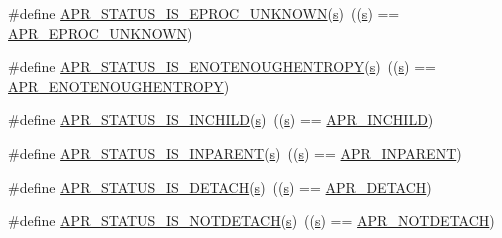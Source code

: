 \begin{DoxyCompactItemize}
\item 
\#define \hyperlink{group__APR__STATUS__IS_gab1267636d1f3fe0dcb79a22b735a5010}{A\+P\+R\+\_\+\+S\+T\+A\+T\+U\+S\+\_\+\+I\+S\+\_\+\+E\+P\+R\+O\+C\+\_\+\+U\+N\+K\+N\+O\+WN}(\hyperlink{pcretest_8txt_a062597889ba244b72877454b1d3adecf}{s})~((\hyperlink{pcretest_8txt_a062597889ba244b72877454b1d3adecf}{s}) == \hyperlink{group__APR__Error_ga01b21dc62b410707f44641d3cea3e6ed}{A\+P\+R\+\_\+\+E\+P\+R\+O\+C\+\_\+\+U\+N\+K\+N\+O\+WN})
\item 
\#define \hyperlink{group__APR__STATUS__IS_gab8b0af2df80bfb9edfc8dbcbb6bdf925}{A\+P\+R\+\_\+\+S\+T\+A\+T\+U\+S\+\_\+\+I\+S\+\_\+\+E\+N\+O\+T\+E\+N\+O\+U\+G\+H\+E\+N\+T\+R\+O\+PY}(\hyperlink{pcretest_8txt_a062597889ba244b72877454b1d3adecf}{s})~((\hyperlink{pcretest_8txt_a062597889ba244b72877454b1d3adecf}{s}) == \hyperlink{group__APR__Error_gaaee9e4e763844197e3750bb66ff75cd0}{A\+P\+R\+\_\+\+E\+N\+O\+T\+E\+N\+O\+U\+G\+H\+E\+N\+T\+R\+O\+PY})
\item 
\#define \hyperlink{group__APR__STATUS__IS_gad60d170a73ed74ec209a1b2165cacb61}{A\+P\+R\+\_\+\+S\+T\+A\+T\+U\+S\+\_\+\+I\+S\+\_\+\+I\+N\+C\+H\+I\+LD}(\hyperlink{pcretest_8txt_a062597889ba244b72877454b1d3adecf}{s})~((\hyperlink{pcretest_8txt_a062597889ba244b72877454b1d3adecf}{s}) == \hyperlink{group__APR__Error_ga5a2bb63099778699feeae9627474c179}{A\+P\+R\+\_\+\+I\+N\+C\+H\+I\+LD})
\item 
\#define \hyperlink{group__APR__STATUS__IS_ga4471f8de6eda3a673aa1f306114c012e}{A\+P\+R\+\_\+\+S\+T\+A\+T\+U\+S\+\_\+\+I\+S\+\_\+\+I\+N\+P\+A\+R\+E\+NT}(\hyperlink{pcretest_8txt_a062597889ba244b72877454b1d3adecf}{s})~((\hyperlink{pcretest_8txt_a062597889ba244b72877454b1d3adecf}{s}) == \hyperlink{group__APR__Error_ga79abc0fb43e51e0db87f90fa49745d89}{A\+P\+R\+\_\+\+I\+N\+P\+A\+R\+E\+NT})
\item 
\#define \hyperlink{group__APR__STATUS__IS_ga64d5d0a6bfe141a387dfdd430a38465b}{A\+P\+R\+\_\+\+S\+T\+A\+T\+U\+S\+\_\+\+I\+S\+\_\+\+D\+E\+T\+A\+CH}(\hyperlink{pcretest_8txt_a062597889ba244b72877454b1d3adecf}{s})~((\hyperlink{pcretest_8txt_a062597889ba244b72877454b1d3adecf}{s}) == \hyperlink{group__APR__Error_gab3f8849983a52f6558016303fb4f5cff}{A\+P\+R\+\_\+\+D\+E\+T\+A\+CH})
\item 
\#define \hyperlink{group__APR__STATUS__IS_ga3084551fdf84919e3c3db4384234521d}{A\+P\+R\+\_\+\+S\+T\+A\+T\+U\+S\+\_\+\+I\+S\+\_\+\+N\+O\+T\+D\+E\+T\+A\+CH}(\hyperlink{pcretest_8txt_a062597889ba244b72877454b1d3adecf}{s})~((\hyperlink{pcretest_8txt_a062597889ba244b72877454b1d3adecf}{s}) == \hyperlink{group__APR__Error_ga83b8407fb5de5840f51dfd2c1439987b}{A\+P\+R\+\_\+\+N\+O\+T\+D\+E\+T\+A\+CH})

\end{DoxyCompactItemize}
